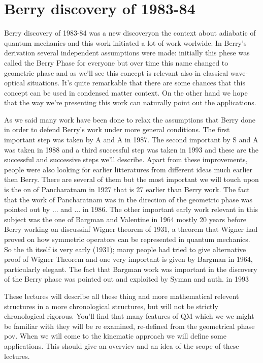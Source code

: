 
\chapter{Berry discovery of 1983-84}
Berry discovery of 1983-84 was a new discoveryon the context about adiabatic of quantum mechanics and this work initiated a lot of work worlwide. In Berry's derivation several independent assumptions were made: initially this phese was called the Berry Phase for everyone but over time this name changed to geometric phase and as we'll see this concept is relevant also in classical wave-optical situations. It's quite remarkable that there are some chances that this concept can be used in condensed matter context. On the other hand we hope that the way we're presenting this work can naturally point out the applications.

As we said many work have been done to relax the assumptions that Berry done in order to defend Berry's work under more general conditions. The first important step was taken by A and A in 1987.
The second important by S and A was taken in 1988 and a third successful step was taken in 1993 and these are the successful and successive steps we'll describe. Apart from these improvements, people were also looking for earlier litteratures from different ideas much earlier then Berry. There are several of them but the most important we will touch upon is the on of Pancharatnam in 1927 that is 27 earlier than Berry work. The fact that the work of Pancharatnam was in the direction of the geometric phase was pointed out by ... and ... in 1986. The other important early work relevant in this subject was the one of Bargman and Valentine in 1964 mostly 20 years before Berry working on discussinf Wigner theorem of 1931, a theorem that Wigner had proved on how symmetric operators can be represented in quantum mechanics. So the th itself is very early (1931); many people had tried to give alternative proof of Wigner Theorem and one very important is given by Bargman in 1964, particularly elegant. The fact that Bargman work was important in the discovery of the Berry phase was pointed out and exploited by Syman and auth. in 1993

These lectures will describe all these thing and more mathematical relevent structures in a more chronological structures, but will not be strictly chronological rigorous. You'll find that many features of QM which we we might be familiar with they will be re examined, re-defined from the geometrical phase pov. When we will come to the kinematic approach we will define some applications. This should give an overviev and an idea of the scope of these lectures.   
